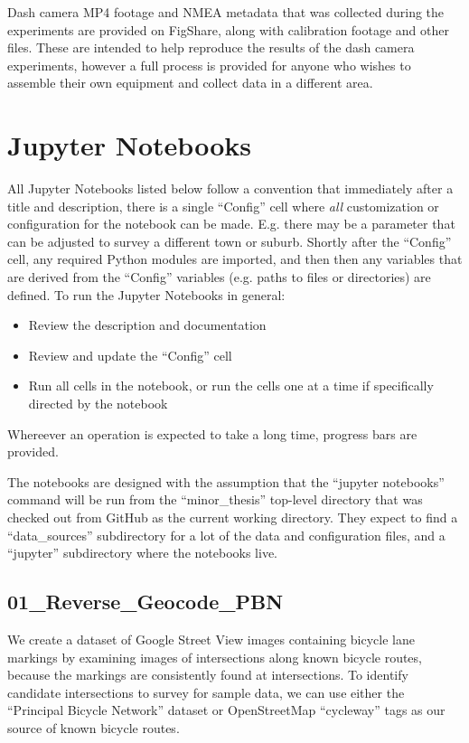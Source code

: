 \documentclass[11pt,twoside]{report}
\begin{document}
Dash camera MP4 footage and NMEA metadata that was collected during the experiments are provided on FigShare, along with calibration footage and other files.  These are intended to help reproduce the results of the dash camera experiments, however a full process is provided for anyone who wishes to assemble their own equipment and collect data in a different area.

\section{Jupyter Notebooks}
\label{aj}

All Jupyter Notebooks listed below follow a convention that immediately after a title and description, there is a single ``Config'' cell where \textit{all} customization or configuration for the notebook can be made.  E.g. there may be a parameter that can be adjusted to survey a different town or suburb.  Shortly after the ``Config'' cell, any required Python modules are imported, and then then any variables that are derived from the ``Config'' variables (e.g. paths to files or directories) are defined.  To run the Jupyter Notebooks in general:

\begin{itemize}
\item{Review the description and documentation}
\item{Review and update the ``Config'' cell}
\item{Run all cells in the notebook, or run the cells one at a time if specifically directed by the notebook}	
\end{itemize}
Whereever an operation is expected to take a long time, progress bars are provided.

The notebooks are designed with the assumption that the ``jupyter notebooks'' command will be run from the ``minor\_thesis'' top-level directory that was checked out from GitHub as the current working directory.  They expect to find a ``data\_sources'' subdirectory for a lot of the data and configuration files, and a ``jupyter'' subdirectory where the notebooks live.

\subsection{01\_Reverse\_Geocode\_PBN}
\label{aj01}

We create a dataset of Google Street View images containing bicycle lane markings by examining images of intersections along known bicycle routes, because the markings are consistently found at intersections.  To identify candidate intersections to survey for sample data, we can use either the ``Principal Bicycle Network'' dataset or OpenStreetMap ``cycleway'' tags as our source of known bicycle routes.
\end{document}
